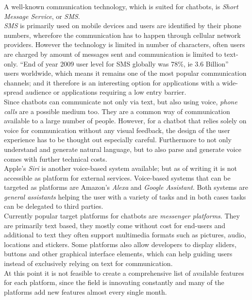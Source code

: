 A well-known communication technology, which is suited for chatbots, is \emph{Short Message Service}, or \emph{SMS}.
\\
\emph{SMS} is primarily used on mobile devices and users are identified by their phone numbers,
wherefore the communication has to happen through cellular network providers.
However the technology is limited in number of characters, often users are charged by amount of messages sent and communication is limited to text-only.
``End of year 2009 user level for SMS globally was 78\%, ie 3.6 Billion''~\cite{mobilenumbers} users worldwide,
which means it remains one of the most popular communication channels;
and it therefore is an interesting option for applications with a wide-spread audience or applications requiring a low entry barrier.
\\

Since chatbots can communicate not only via text, but also using voice, \emph{phone calls} are a possible medium too.
They are a common way of communication available to a large number of people.
However, for a chatbot that relies solely on voice for communication without any visual feedback, the design of the user experience has to be thought out especially careful.
Furthermore to not only understand and generate natural language,
but to also parse and generate voice comes with further technical costs.
\\

Apple's \emph{Siri} is another voice-based system available; but as of writing it is not accessible as platform for external services.
Voice-based systems that can be targeted as platforms are Amazon's \emph{Alexa} and \emph{Google Assistant}.
Both systems are \emph{general assistants} helping the user with a variety of tasks
and in both cases tasks can be delegated to third parties.
\\

Currently popular target platforms for chatbots are \emph{messenger platforms}.
They are primarily text based, they mostly come without cost for end-users and additional to text they often support multimedia formats such as pictures, audio, locations and stickers.
Some platforms also allow developers to display sliders, buttons and other graphical interface elements, which can help guiding users instead of exclusively relying on text for communication.
\\
At this point it is not feasible to create a comprehensive list of available features for each platform, since the field is innovating constantly and many of the platforms add new features almost every single month.
\\

